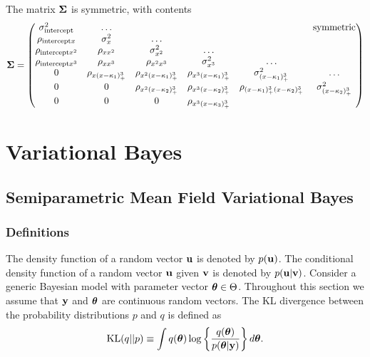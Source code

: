 \documentclass{amsart}[12pt]
\begin{document}
The matrix ${\boldsymbol \Sigma}$ is symmetric, with contents
\[
	{\boldsymbol \Sigma} =
	\begin{pmatrix}
	\sigma^2_{\text{intercept}} & \ldots & & & & \text{symmetric} \\
		\rho_{\text{intercept} x} & \sigma^2_x & \ldots\\
		\rho_{\text{intercept} x^2} & \rho_{x x^2} & \sigma^2_{x^2} & \ldots \\
		\rho_{\text{intercept} x^3} & \rho_{x x^3} & \rho_{x^2 x^3} & \sigma^2_{x^3} & \ldots \\
		0 & \rho_{x (x - \kappa_1)^3_+} & \rho_{x^2 (x-\kappa_1)_+^3} & \rho_{x^3 (x - \kappa_1)_+^3} & \sigma^2_{(x - \kappa_1)_+^3} & \ldots \\
		0 & 0 & \rho_{x^2 (x-\kappa_2)_+^3} & \rho_{x^3 (x-\kappa_2)_+^3} & \rho_{(x-\kappa_1)_+^3 (x-\kappa_2)_+^3} &\sigma^2_{(x - \kappa_2)_+^3} \\
		0 & 0 & 0 & \rho_{x^3 (x - \kappa_3)_+^3} \\
	\end{pmatrix}
\]



\section{Variational Bayes}
\label{sec:vb}




\subsection{Semiparametric Mean Field Variational Bayes}

\subsubsection{Definitions}

The density function of a random vector ${\bf u}$ is denoted by $p({\bf u})$.  The conditional density function of a
random vector ${\bf u}$ given ${\bf v}$ is denoted by $p({\bf u}|{\bf v})$. Consider a generic Bayesian model with parameter
vector ${\boldsymbol \theta} \in \Theta$. Throughout this section we assume that ${\bf y}$ and ${\boldsymbol \theta}$ are continuous random
vectors. The KL divergence between the probability distributions $p$ and $q$ is defined as
$$
\text{KL}(q || p) \equiv \int q({\boldsymbol \theta}) \log \left \{ \frac{q({\boldsymbol \theta})}{p({\boldsymbol \theta} | {\bf y})} \right \} d {\boldsymbol \theta}.
$$
\end{document}

